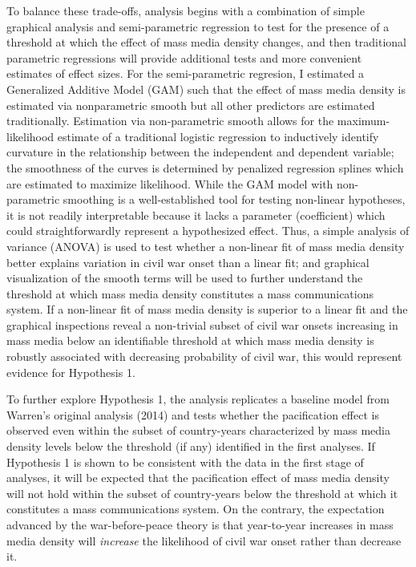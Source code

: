 \documentclass[11pt,article,oneside]{memoir}
\begin{document}
To balance these trade-offs, analysis begins with a combination of
simple graphical analysis and semi-parametric regression to test for the
presence of a threshold at which the effect of mass media density
changes, and then traditional parametric regressions will provide
additional tests and more convenient estimates of effect sizes. For the
semi-parametric regresion, I estimated a Generalized Additive Model
(GAM) such that the effect of mass media density is estimated via
nonparametric smooth but all other predictors are estimated
traditionally. Estimation via non-parametric smooth allows for the
maximum-likelihood estimate of a traditional logistic regression to
inductively identify curvature in the relationship between the
independent and dependent variable; the smoothness of the curves is
determined by penalized regression splines which are estimated to
maximize likelihood. While the GAM model with non-parametric smoothing
is a well-established tool for testing non-linear hypotheses, it is not
readily interpretable because it lacks a parameter (coefficient) which
could straightforwardly represent a hypothesized effect. Thus, a simple
analysis of variance (ANOVA) is used to test whether a non-linear fit of
mass media density better explains variation in civil war onset than a
linear fit; and graphical visualization of the smooth terms will be used
to further understand the threshold at which mass media density
constitutes a mass communications system. If a non-linear fit of mass
media density is superior to a linear fit and the graphical inspections
reveal a non-trivial subset of civil war onsets increasing in mass media
below an identifiable threshold at which mass media density is robustly
associated with decreasing probability of civil war, this would
represent evidence for Hypothesis 1.

To further explore Hypothesis 1, the analysis replicates a baseline
model from Warren's original analysis (2014) and tests whether the
pacification effect is observed even within the subset of country-years
characterized by mass media density levels below the threshold (if any)
identified in the first analyses. If Hypothesis 1 is shown to be
consistent with the data in the first stage of analyses, it will be
expected that the pacification effect of mass media density will not
hold within the subset of country-years below the threshold at which it
constitutes a mass communications system. On the contrary, the
expectation advanced by the war-before-peace theory is that year-to-year
increases in mass media density will \emph{increase} the likelihood of
civil war onset rather than decrease it.
\end{document}
